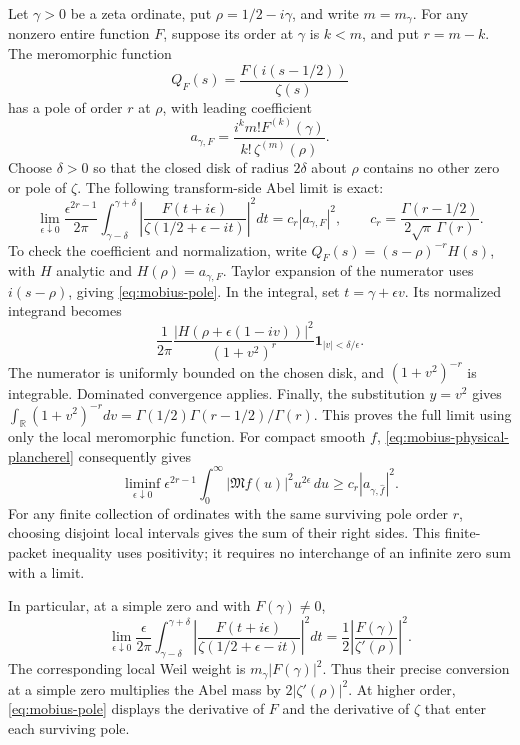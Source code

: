 Let \(\gamma>0\) be a zeta ordinate, put
\(\rho=1/2-i\gamma\), and write \(m=m_\gamma\).
For any nonzero entire function \(F\), suppose its order at
\(\gamma\) is \(k<m\), and put \(r=m-k\). The meromorphic
function
\[
 Q_F(s)=\frac{F(i(s-1/2))}{\zeta(s)}
\]
has a pole of order \(r\) at \(\rho\), with leading coefficient
\begin{equation}\label{eq:mobius-pole}
 a_{\gamma,F}
 =\frac{i^k m!F^{(k)}(\gamma)}{k!\,\zeta^{(m)}(\rho)}.
\end{equation}
Choose \(\delta>0\) so that the closed disk of radius \(2\delta\)
about \(\rho\) contains no other zero or pole of \(\zeta\).
The following transform-side Abel limit is exact:
\begin{equation}\label{eq:mobius-abel}
 \lim_{\epsilon\downarrow0}
 \frac{\epsilon^{2r-1}}{2\pi}
 \int_{\gamma-\delta}^{\gamma+\delta}
 \left|\frac{F(t+i\epsilon)}
 {\zeta(1/2+\epsilon-it)}\right|^2dt
 =c_r|a_{\gamma,F}|^2,
 \qquad
 c_r=\frac{\Gamma(r-1/2)}{2\sqrt\pi\,\Gamma(r)}.
\end{equation}
To check the coefficient and normalization, write
\(Q_F(s)=(s-\rho)^{-r}H(s)\), with \(H\) analytic and
\(H(\rho)=a_{\gamma,F}\). Taylor expansion of the numerator
uses \(i(s-\rho)\), giving \eqref{eq:mobius-pole}.
In the integral, set \(t=\gamma+\epsilon v\). Its normalized
integrand becomes
\[
 \frac1{2\pi}
 \frac{|H(\rho+\epsilon(1-iv))|^2}{(1+v^2)^r}
       \mathbf1_{|v|<\delta/\epsilon}.
\]
The numerator is uniformly bounded on the chosen disk, and
\((1+v^2)^{-r}\) is integrable. Dominated convergence applies.
Finally, the substitution \(y=v^2\) gives
\(\int_{\mathbb R}(1+v^2)^{-r}dv
 =\Gamma(1/2)\Gamma(r-1/2)/\Gamma(r)\).
This proves the full limit using only the local meromorphic function.
For compact smooth \(f\),
\eqref{eq:mobius-physical-plancherel} consequently gives
\begin{equation}\label{eq:mobius-physical-lower}
 \liminf_{\epsilon\downarrow0}\epsilon^{2r-1}
 \int_0^\infty|\mathfrak M f(u)|^2u^{2\epsilon}\,du
 \ge c_r|a_{\gamma,\widehat f}|^2.
\end{equation}
For any finite collection of ordinates with the same surviving
pole order \(r\), choosing disjoint local intervals gives the sum
of their right sides. This finite-packet inequality uses positivity;
it requires no interchange of an infinite zero sum with a limit.

In particular, at a simple zero and with \(F(\gamma)\ne0\),
\begin{equation}\label{eq:mobius-simple-mass}
 \lim_{\epsilon\downarrow0}\frac{\epsilon}{2\pi}
 \int_{\gamma-\delta}^{\gamma+\delta}
 \left|\frac{F(t+i\epsilon)}
 {\zeta(1/2+\epsilon-it)}\right|^2dt
 =\frac12\left|\frac{F(\gamma)}{\zeta'(\rho)}\right|^2.
\end{equation}
The corresponding local Weil weight is \(m_\gamma|F(\gamma)|^2\).
Thus their precise conversion at a simple zero multiplies the Abel
mass by \(2|\zeta'(\rho)|^2\). At higher order,
\eqref{eq:mobius-pole} displays the derivative of \(F\) and the
derivative of \(\zeta\) that enter each surviving pole.

